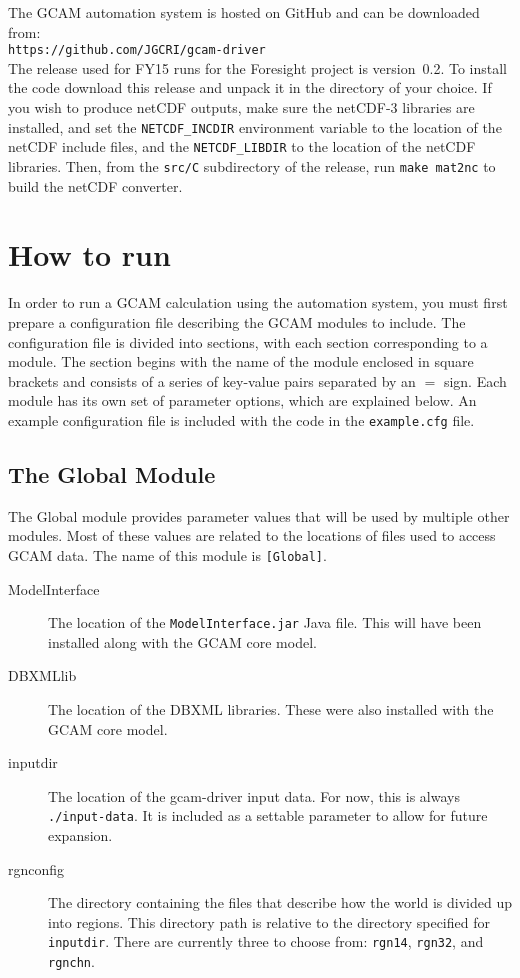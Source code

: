 \documentclass[11pt]{article}
\begin{document}
The GCAM automation system is hosted on GitHub and can be downloaded
from:\\
\texttt{https://github.com/JGCRI/gcam-driver}\\
The release used for FY15 runs for the Foresight project is
version~0.2.  To install the code download this release and unpack it
in the directory of your choice.  If you wish to produce netCDF
outputs, make sure the netCDF-3 libraries are installed, and set the
\texttt{NETCDF_INCDIR} environment variable to the location of the
netCDF include files, and the \texttt{NETCDF_LIBDIR} to the location
of the netCDF libraries.  Then, from the \texttt{src/C} subdirectory
of the release, run \texttt{make mat2nc} to build the netCDF
converter.

\section{How to run}

In order to run a GCAM calculation using the automation system, you
must first prepare a configuration file describing the GCAM modules to
include.  The configuration file is divided into sections, with each
section corresponding to a module.  The section begins with the name
of the module enclosed in square brackets and consists of a series of
key-value pairs separated by an $=$ sign.  Each module has its own set
of parameter options, which are explained below.  An example configuration
file is included with the code in the \texttt{example.cfg} file.

\subsection{The Global Module}
The Global module provides parameter values that will be used by multiple
other modules.  Most of these values are related to the locations of
files used to access GCAM data.  The name of this module is
\texttt{[Global]}.
\begin{description}
\item[ModelInterface] The location of the \texttt{ModelInterface.jar}
  Java file.  This will have been installed along with the GCAM core
  model.
\item[DBXMLlib] The location of the DBXML libraries.  These were also
  installed with the GCAM core model.
\item[inputdir] The location of the gcam-driver input data.  For now,
  this is always \texttt{./input-data}.  It is included as a settable
  parameter to allow for future expansion.
\item[rgnconfig] The directory containing the files that describe how
  the world is divided up into regions.  This directory path is
  relative to the directory specified for \texttt{inputdir}.  There
  are currently three to choose from:  \texttt{rgn14}, \texttt{rgn32},
  and \texttt{rgnchn}.
\end{description}
\end{document}
